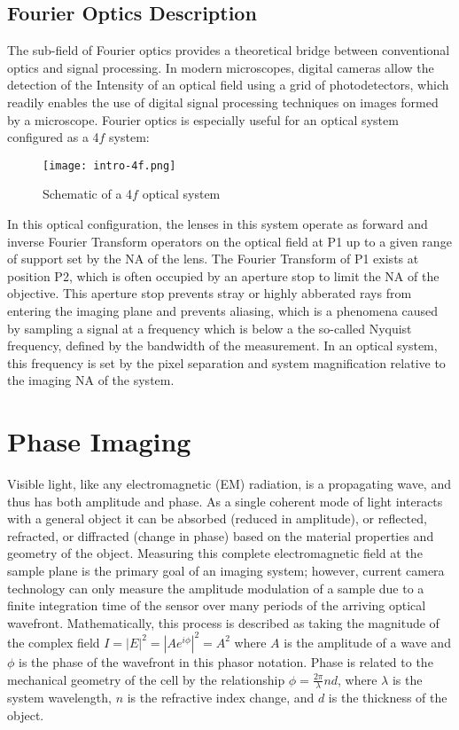 \subsection{Fourier Optics Description}
The sub-field of Fourier optics provides a theoretical bridge between conventional optics and signal processing. In modern microscopes, digital cameras allow the detection of the Intensity of an optical field using a grid of photodetectors, which readily enables the use of digital signal processing techniques on images formed by a microscope. Fourier optics is especially useful for an optical system configured as a 4$f$ system:

\begin{figure}[tbh]
\centering
\texttt{[image: intro-4f.png]}
\caption{\label{fig:4f} Schematic of a 4$f$ optical system}
\end{figure}

In this optical configuration, the lenses in this system operate as forward and inverse Fourier Transform operators on the optical field at P1 up to a given range of support set by the NA of the lens. The Fourier Transform of P1 exists at position P2, which is often occupied by an aperture stop to limit the NA of the objective. This aperture stop prevents stray or highly abberated rays from entering the imaging plane and prevents aliasing, which is a phenomena caused by sampling a signal at a frequency which is below a the so-called Nyquist frequency, defined by the bandwidth of the measurement. In an optical system, this frequency is set by the pixel separation and system magnification relative to the imaging NA of the system. 

\section{Phase Imaging}
Visible light, like any electromagnetic (EM) radiation, is a propagating wave, and thus has both amplitude and phase. As a single coherent mode of light interacts with a general object it can be absorbed (reduced in amplitude), or reflected, refracted, or diffracted (change in phase) based on the material properties and geometry of the object. Measuring this complete electromagnetic field at the sample plane is the primary goal of an imaging system; however, current camera technology can only measure the amplitude modulation of a sample due to a finite integration time of the sensor over many periods of the arriving optical wavefront. Mathematically, this process is described as taking the magnitude of the complex field $I =|E|^2 =|Ae^{i\phi}|^2 = A^2$ where $A$ is the amplitude of a wave and $\phi$ is the phase of the wavefront in this phasor notation. Phase is related to the mechanical geometry of the cell by the relationship $\phi = \frac{2\pi}{\lambda} n d$, where $\lambda$ is the system wavelength, $n$ is the refractive index change, and $d$ is the thickness of the object.

